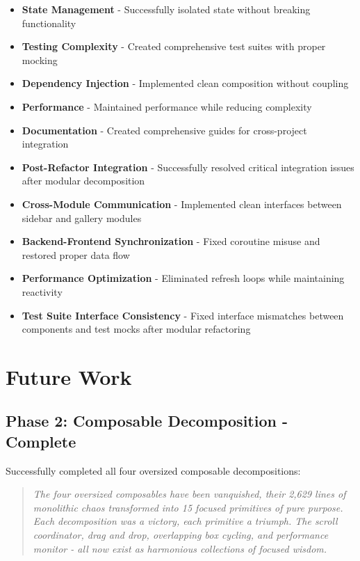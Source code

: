 \documentclass[11pt]{article}
\begin{document}
\begin{itemize}
\item \textbf{State Management} - Successfully isolated state without breaking functionality
\item \textbf{Testing Complexity} - Created comprehensive test suites with proper mocking
\item \textbf{Dependency Injection} - Implemented clean composition without coupling
\item \textbf{Performance} - Maintained performance while reducing complexity
\item \textbf{Documentation} - Created comprehensive guides for cross-project integration
\item \textbf{Post-Refactor Integration} - Successfully resolved critical integration issues after modular decomposition
\item \textbf{Cross-Module Communication} - Implemented clean interfaces between sidebar and gallery modules
\item \textbf{Backend-Frontend Synchronization} - Fixed coroutine misuse and restored proper data flow
\item \textbf{Performance Optimization} - Eliminated refresh loops while maintaining reactivity
\item \textbf{Test Suite Interface Consistency} - Fixed interface mismatches between components and test mocks after modular refactoring
\end{itemize}

\section{Future Work}

\subsection{Phase 2: Composable Decomposition - Complete}

Successfully completed all four oversized composable decompositions:

\begin{quote}
\emph{The four oversized composables have been vanquished, their 2,629 lines of monolithic chaos transformed into 15 focused primitives of pure purpose. Each decomposition was a victory, each primitive a triumph. The scroll coordinator, drag and drop, overlapping box cycling, and performance monitor - all now exist as harmonious collections of focused wisdom.}
\end{quote}
\end{document}
